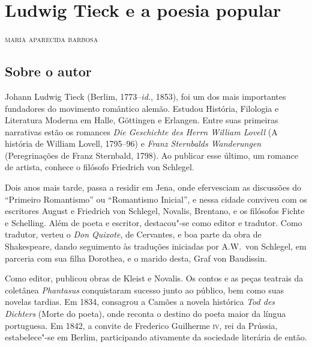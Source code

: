\chapter{Ludwig Tieck e a poesia popular}

\begin{flushright}
\textsc{maria aparecida barbosa}
\end{flushright}\bigskip

\section{Sobre o autor}

\noindent{}Johann Ludwig Tieck (Berlim, 1773--\textit{id.}, 1853), 
foi um dos mais importantes fundadores do movimento romântico alemão. 
Estudou História, Filologia e Literatura Moderna em Halle, 
Göttingen e Erlangen. Entre suas primeiras narrativas estão os romances 
\textit{Die Geschichte des Herrn William Lovell} (A história de William Lovell, 
1795--96) e \textit{Franz Sternbalds Wanderungen} 
(Peregrinações de Franz Sternbald, 1798). 
Ao publicar esse último, um romance de artista, conhece o filósofo 
Friedrich von Schlegel.

Dois anos mais tarde, passa a residir em Jena, 
onde efervesciam as  discussões do ``Primeiro Romantismo'' ou ``Romantismo 
Inicial'', e nessa  cidade conviveu com os escritores August e Friedrich von Schlegel,  Novalis, Brentano, e os filósofos Fichte e Schelling. Além de poeta e escritor, destacou"-se como editor e tradutor. Como tradutor, verteu o \textit{Don Quixote}, de Cervantes, e boa parte da obra de Shakespeare, dando seguimento às traduções iniciadas por A.W.~von Schlegel, 
em parceria com sua filha Dorothea, e o marido desta,
Graf von Baudissin.

Como editor, publicou obras de Kleist e Novalis.
Os contos e as peças teatrais da coletânea \textit{Phantasus} conquistaram 
sucesso junto ao público, bem como suas novelas tardias. Em 1834, consagrou 
a Camões a novela histórica \textit{Tod des Dichters} (Morte do poeta), onde 
reconta o destino do poeta maior da língua portuguesa. Em 1842, a convite 
de Frederico Guilherme \textsc{iv}, rei da Prússia, estabelece"-se em Berlim, 
participando ativamente da sociedade literária de então.


